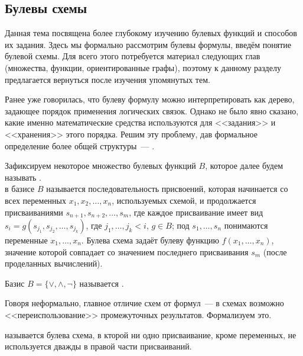 \subsection{Булевы схемы}
\label{subsec:boolean:schemes}

Данная тема посвящена более глубокому изучению булевых функций и способов их задания.
Здесь мы формально рассмотрим булевы формулы, введём понятие булевой схемы.
Для всего этого потребуется материал следующих глав (множества, функции, ориентированные графы),
поэтому к данному разделу предлагается вернуться после изучения упомянутых тем.

Ранее уже говорилась, что булеву формулу можно интерпретировать как дерево,
задающее порядок применения логических связок.
Однако не было явно сказано, какие именно математические средства используются для <<задания>> и <<хранения>> этого порядка.
Решим эту проблему, дав формальное определение более общей структуры~--- .

\begin{definition}
    \label{definition:boolean:boolean_scheme}
    Зафиксируем некоторое множество булевых функций $ B $, которое далее будем называть .
    \\[0.25\baselineskip]
     в базисе $ B $ называется последовательность присвоений,
    которая начинается со всех переменных $ x_1, x_2, \ldots, x_n $, используемых схемой,
    и продолжается присваиваниями $ s_{n+1}, s_{n+2}, \ldots, s_m $,
    где каждое присваивание имеет вид $ s_i = g(s_{j_1} , s_{j_2}, \ldots, s_{j_k} ) $,
    где $ j_1, \ldots, j_k < i $, $ g \in B $;
    под $ s_1, \ldots, s_n $ понимаются переменные $ x_1, \ldots, x_n $.
    Булева схема задаёт булеву функцию $ f(x_1, \ldots, x_n) $,
    значение которой совпадает со значением последнего присваивания $ s_m $ (после проделанных вычислений).
\end{definition}

\begin{definition}
    \label{definition:boolean:standard_basis}
    Базис $ B = \{ \vee, \wedge, \neg \} $ называется .
\end{definition}

Говоря неформально, главное отличие схем от формул~--- в схемах возможно <<переиспользование>> промежуточных результатов.
Формализуем это.

\begin{definition}
    \label{definition:boolean:boolean_formula}
     называется булева схема,
    в кторой ни одно присваивание, кроме переменных, не используется дважды в правой части присваиваний.
\end{definition}

